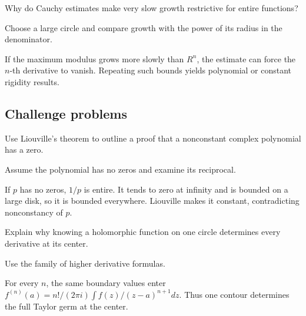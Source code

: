 \begin{exercise}\label{exr:iv06-expand-14}
Why do Cauchy estimates make very slow growth restrictive for entire functions?
\end{exercise}
\begin{hint}
Choose a large circle and compare growth with the power of its radius in the denominator.
\end{hint}
\begin{solution}
If the maximum modulus grows more slowly than \(R^n\), the estimate can force the \(n\)-th derivative to vanish. Repeating such bounds yields polynomial or constant rigidity results.
\end{solution}

\subsection*{Challenge problems}

\begin{exercise}\label{exr:iv06-expand-15}
Use Liouville's theorem to outline a proof that a nonconstant complex polynomial has a zero.
\end{exercise}
\begin{hint}
Assume the polynomial has no zeros and examine its reciprocal.
\end{hint}
\begin{solution}
If \(p\) has no zeros, \(1/p\) is entire. It tends to zero at infinity and is bounded on a large disk, so it is bounded everywhere. Liouville makes it constant, contradicting nonconstancy of \(p\).
\end{solution}

\begin{exercise}\label{exr:iv06-expand-16}
Explain why knowing a holomorphic function on one circle determines every derivative at its center.
\end{exercise}
\begin{hint}
Use the family of higher derivative formulas.
\end{hint}
\begin{solution}
For every \(n\), the same boundary values enter \(f^{(n)}(a)=n!/(2\pi i)\int f(z)/(z-a)^{n+1}dz\). Thus one contour determines the full Taylor germ at the center.
\end{solution}


